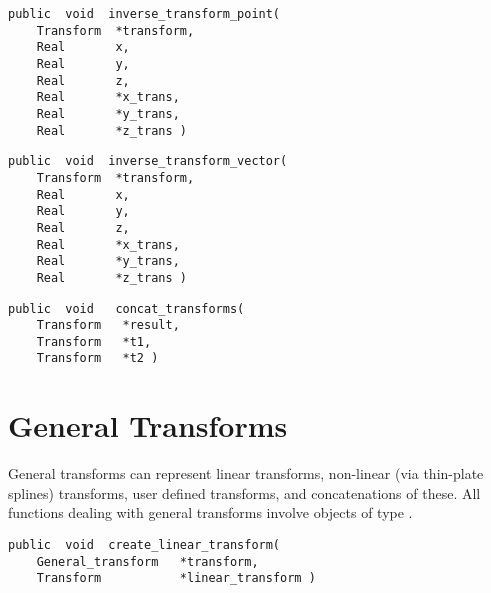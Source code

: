 
{\bf\begin{verbatim}
public  void  inverse_transform_point(
    Transform  *transform,
    Real       x,
    Real       y,
    Real       z,
    Real       *x_trans,
    Real       *y_trans,
    Real       *z_trans )
\end{verbatim}}


{\bf\begin{verbatim}
public  void  inverse_transform_vector(
    Transform  *transform,
    Real       x,
    Real       y,
    Real       z,
    Real       *x_trans,
    Real       *y_trans,
    Real       *z_trans )
\end{verbatim}}


{\bf\begin{verbatim}
public  void   concat_transforms(
    Transform   *result,
    Transform   *t1,
    Transform   *t2 )
\end{verbatim}}


\section{General Transforms}

General transforms can represent linear transforms, non\--\-linear
(via thin\--\-plate splines) transforms, user defined transforms, and
concatenations of these.  All functions dealing with general
transforms involve objects of type .

{\bf\begin{verbatim}
public  void  create_linear_transform(
    General_transform   *transform,
    Transform           *linear_transform )
\end{verbatim}}

